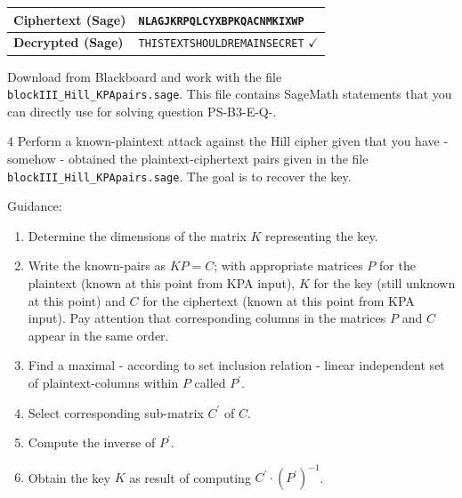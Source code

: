 \documentclass[]{scrartcl}
\newcounter{exercise}
\newcounter{qid}[section]
\newcommand{\exerciseprefix}{prefix}
\newcommand{\questiontitle}{Questions}
\newcommand{\blockid}{B3}
\newcommand{\exname}{}
\newcommand{\filename}[1]{\texttt{#1}}
\begin{document}
\begin{center}
\begin{tabular}{|l|l|}
\hline
\textbf{Ciphertext (Sage)} & \texttt{NLAGJKRPQLCYXBPKQACNMKIXWP} \\
\hline
\textbf{Decrypted (Sage)}  & \texttt{THISTEXTSHOULDREMAINSECRET} $\checkmark$ \\
\hline
\end{tabular}
\end{center}

\renewcommand{\questiontitle}{Preparation (!) for question PS-\blockid{}-E\theexercise-Q-\theqid}
\begin{exercisebox}{}
Download from Blackboard and work with the file \filename{blockIII\_Hill\_KPApairs.sage}. This file contains SageMath statements that you can directly use for solving question PS-\blockid{}-E\theexercise-Q-\theqid. 
\end{exercisebox}

\renewcommand{\exerciseprefix}{PS-\blockid{}-E\theexercise: \exname-Q\theqid}
\renewcommand{\questiontitle}{\exerciseprefix{}: Known-plaintext attack}
\begin{exercisebox}{4}
Perform a known-plaintext attack against the Hill cipher given that you have - somehow - obtained the plaintext-ciphertext pairs given in the file \filename{blockIII\_Hill\_KPApairs.sage}. The goal is to recover the key. 

{\small
Guidance:
\begin{enumerate}
    \item Determine the dimensions of the matrix $K$ representing the key. 
    \item Write the known-pairs as $KP=C$; with appropriate matrices $P$ for the plaintext (known at this point from KPA input), $K$ for the key (still unknown at this point) and $C$ for the ciphertext (known at this point from KPA input). Pay attention that corresponding columns in the matrices $P$ and $C$ appear in the same order. 
    \item Find a maximal - according to set inclusion relation - linear independent set of plaintext-columns within $P$ called $P^{\prime}$.
    \item Select corresponding sub-matrix $C^{\prime}$ of $C$. 
    \item Compute the inverse of $P^{\prime}$.
    \item Obtain the key $K$ as result of computing $C^{\prime} \cdot (P^{\prime})^{-1}$. 
\end{enumerate}

}
\end{exercisebox}
\end{document}
